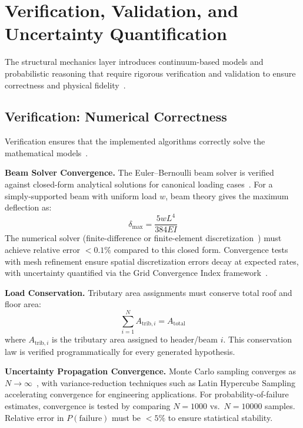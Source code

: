 
\section{Verification, Validation, and Uncertainty Quantification}
\label{sec:vvuq}

The structural mechanics layer introduces continuum-based models and probabilistic reasoning that require rigorous verification and validation to ensure correctness and physical fidelity~\cite{oberkampf_roy_2010,roache1998_vv,asme_vv10_2006}.

\subsection{Verification: Numerical Correctness}

Verification ensures that the implemented algorithms correctly solve the mathematical models~\cite{oberkampf_roy_2010,asme_vv10_2006}.

\textbf{Beam Solver Convergence.}
The Euler--Bernoulli beam solver is verified against closed-form analytical solutions for canonical loading cases~\cite{timoshenko_goodier_1970}.
For a simply-supported beam with uniform load $w$, beam theory gives the maximum deflection as:
\[
\delta_{\max} = \frac{5wL^4}{384EI}
\]
The numerical solver (finite-difference or finite-element discretization~\cite{reddy_fem_2005,bathe_fem_1996}) must achieve relative error $< 0.1\%$ compared to this closed form.
Convergence tests with mesh refinement ensure spatial discretization errors decay at expected rates, with uncertainty quantified via the Grid Convergence Index framework~\cite{celik2008_gci,asme_vv20_2009}.

\textbf{Load Conservation.}
Tributary area assignments must conserve total roof and floor area:
\[
\sum_{i=1}^{N} A_{\text{trib},i} = A_{\text{total}}
\]
where $A_{\text{trib},i}$ is the tributary area assigned to header/beam $i$.
This conservation law is verified programmatically for every generated hypothesis.

\textbf{Uncertainty Propagation Convergence.}
Monte Carlo sampling converges as $N \to \infty$~\cite{robert_casella_2004}, with variance-reduction techniques such as Latin Hypercube Sampling~\cite{mckay1979_lhs} accelerating convergence for engineering applications.
For probability-of-failure estimates, convergence is tested by comparing $N = 1000$ vs.\ $N = 10000$ samples.
Relative error in $P(\text{failure})$ must be $< 5\%$ to ensure statistical stability.

